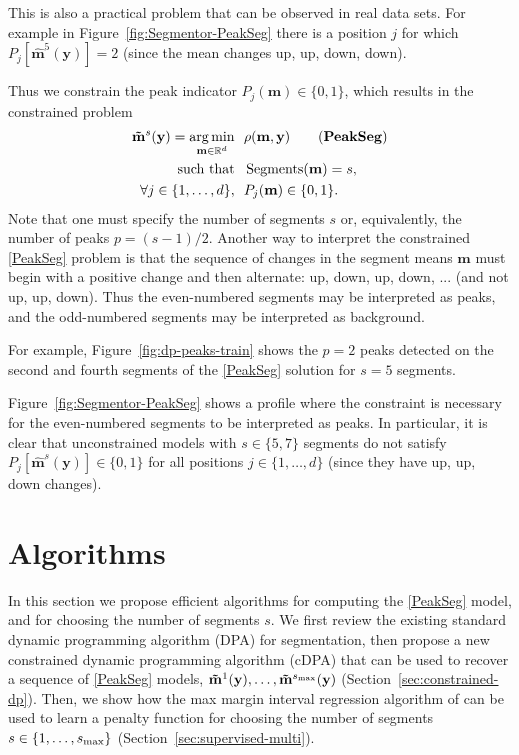 \documentclass{article}
\DeclareMathOperator*{\argmin}{arg\,min}
\DeclareMathOperator*{\Segments}{Segments}
\newcommand{\RR}{\mathbb R}
\begin{document}
This is also a practical problem that can be observed in real data
sets. For example in Figure~\ref{fig:Segmentor-PeakSeg} there is a position $j$ for
which $P_j\left[ \mathbf{\hat m}^5(\mathbf y) \right]=2$ (since the
mean changes up, up, down, down). 

Thus we constrain the peak indicator $P_j(\mathbf
m)\in\{0, 1\}$, which results
in the constrained problem
\begin{align*}
  \label{PeakSeg}
  \mathbf{\tilde m}^s(\mathbf y)  =
    \argmin_{\mathbf m\in\RR^{d}} &\ \ 
    \rho(\mathbf m, \mathbf y) 
    \tag{\textbf{PeakSeg}}
\\
    \text{such that} &\ \  \Segments(\mathbf m)=s,  \\
     \forall j\in\{1, \dots, d\}, &\ \ P_j(\mathbf m) \in\{0, 1\}.
\end{align*}
Note that one must specify the number of segments $s$ or,
equivalently, the number of peaks $p=(s-1)/2$. Another way to
interpret the constrained \ref{PeakSeg} problem is that the sequence
of changes in the segment means $\mathbf m$ must begin with a positive
change and then alternate: up, down, up, down, ... (and not up, up,
down). Thus the even-numbered segments may be interpreted as peaks,
and the odd-numbered segments may be interpreted as background.

For example, Figure~\ref{fig:dp-peaks-train} shows the $p=2$ peaks
detected on the second and fourth segments of the \ref{PeakSeg}
solution for $s=5$ segments.

Figure~\ref{fig:Segmentor-PeakSeg} shows a profile where the constraint is
necessary for the even-numbered segments to be interpreted as
peaks. In particular, it is clear that unconstrained models with
$s\in\{5, 7\}$ segments do not satisfy $P_j[\mathbf{\hat m}^s(\mathbf
y)]\in\{0, 1\}$ for all positions $j\in\{1,\dots, d\}$ (since they
have up, up, down changes).

\section{Algorithms}
\label{sec:algorithms}

In this section we propose efficient algorithms for computing the
\ref{PeakSeg} model, and for choosing the number of segments $s$. We
first review the existing standard dynamic programming algorithm (DPA)
for segmentation, then propose a new constrained dynamic programming
algorithm (cDPA) that can be used to recover a sequence of
\ref{PeakSeg} models, $\mathbf{\tilde m}^1(\mathbf y), \dots,
\mathbf{\tilde m}^{s_{\text{\text{max}}}}(\mathbf y)$
(Section~\ref{sec:constrained-dp}). Then, we show how the max margin
interval regression algorithm of \citet{HOCKING-penalties} can be used
to learn a penalty function for choosing the number of segments
$s\in\{1, \dots, s_{\text{\text{max}}}\}$
(Section~\ref{sec:supervised-multi}).
\end{document}
